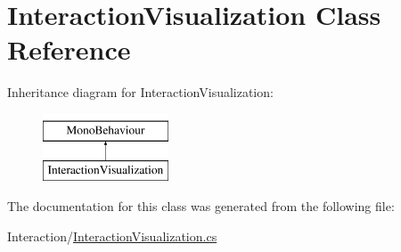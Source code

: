 \hypertarget{class_interaction_visualization}{}\section{Interaction\+Visualization Class Reference}
\label{class_interaction_visualization}
Inheritance diagram for Interaction\+Visualization\+:\begin{figure}[H]
\begin{center}
\leavevmode
\includegraphics[height=2.000000cm]{class_interaction_visualization}
\end{center}
\end{figure}


The documentation for this class was generated from the following file\+:\begin{DoxyCompactItemize}
\item 
Interaction/\mbox{\hyperlink{_interaction_visualization_8cs}{Interaction\+Visualization.\+cs}}\end{DoxyCompactItemize}
